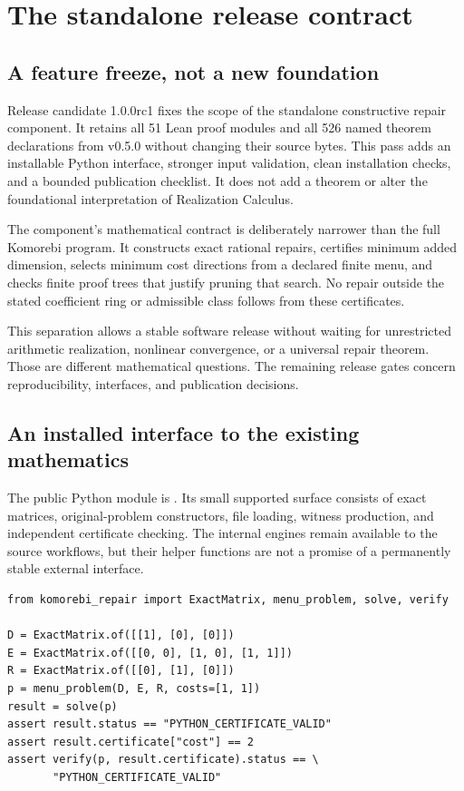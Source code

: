 \chapter{The standalone release contract}
\label{app:release-candidate}

\section{A feature freeze, not a new foundation}

Release candidate 1.0.0rc1 fixes the scope of the standalone constructive repair component. It retains all 51 Lean proof modules and all 526 named theorem declarations from v0.5.0 without changing their source bytes. This pass adds an installable Python interface, stronger input validation, clean installation checks, and a bounded publication checklist. It does not add a theorem or alter the foundational interpretation of Realization Calculus.

The component's mathematical contract is deliberately narrower than the full Komorebi program. It constructs exact rational repairs, certifies minimum added dimension, selects minimum cost directions from a declared finite menu, and checks finite proof trees that justify pruning that search. No repair outside the stated coefficient ring or admissible class follows from these certificates.

This separation allows a stable software release without waiting for unrestricted arithmetic realization, nonlinear convergence, or a universal repair theorem. Those are different mathematical questions. The remaining release gates concern reproducibility, interfaces, and publication decisions.

\section{An installed interface to the existing mathematics}

The public Python module is . Its small supported surface consists of exact matrices, original-problem constructors, file loading, witness production, and independent certificate checking. The internal engines remain available to the source workflows, but their helper functions are not a promise of a permanently stable external interface.

\begin{Verbatim}[fontsize=\small,breaklines=true]
from komorebi_repair import ExactMatrix, menu_problem, solve, verify

D = ExactMatrix.of([[1], [0], [0]])
E = ExactMatrix.of([[0, 0], [1, 0], [1, 1]])
R = ExactMatrix.of([[0], [1], [0]])
p = menu_problem(D, E, R, costs=[1, 1])
result = solve(p)
assert result.status == "PYTHON_CERTIFICATE_VALID"
assert result.certificate["cost"] == 2
assert verify(p, result.certificate).status == \
       "PYTHON_CERTIFICATE_VALID"
\end{Verbatim}

